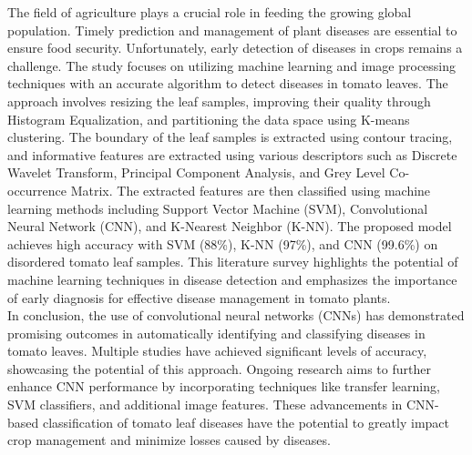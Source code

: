 \documentclass[conference]{IEEEtran}
\begin{document}
The field of agriculture plays a crucial role in feeding the growing global population. Timely prediction and management of plant diseases are essential to ensure food security. Unfortunately, early detection of diseases in crops remains a challenge. \cite{HARAKANNANAVAR2022305} The study focuses on utilizing machine learning and image processing techniques with an accurate algorithm to detect diseases in tomato leaves. The approach involves resizing the leaf samples, improving their quality through Histogram Equalization, and partitioning the data space using K-means clustering. The boundary of the leaf samples is extracted using contour tracing, and informative features are extracted using various descriptors such as Discrete Wavelet Transform, Principal Component Analysis, and Grey Level Co-occurrence Matrix. The extracted features are then classified using machine learning methods including Support Vector Machine (SVM), Convolutional Neural Network (CNN), and K-Nearest Neighbor (K-NN). The proposed model achieves high accuracy with SVM (88\%), K-NN (97\%), and CNN (99.6\%) on disordered tomato leaf samples. This literature survey highlights the potential of machine learning techniques in disease detection and emphasizes the importance of early diagnosis for effective disease management in tomato plants.\\




In conclusion, the use of convolutional neural networks (CNNs) has demonstrated promising outcomes in automatically identifying and classifying diseases in tomato leaves. Multiple studies have achieved significant levels of accuracy, showcasing the potential of this approach. Ongoing research aims to further enhance CNN performance by incorporating techniques like transfer learning, SVM classifiers, and additional image features. These advancements in CNN-based classification of tomato leaf diseases have the potential to greatly impact crop management and minimize losses caused by diseases.




\end{document}
